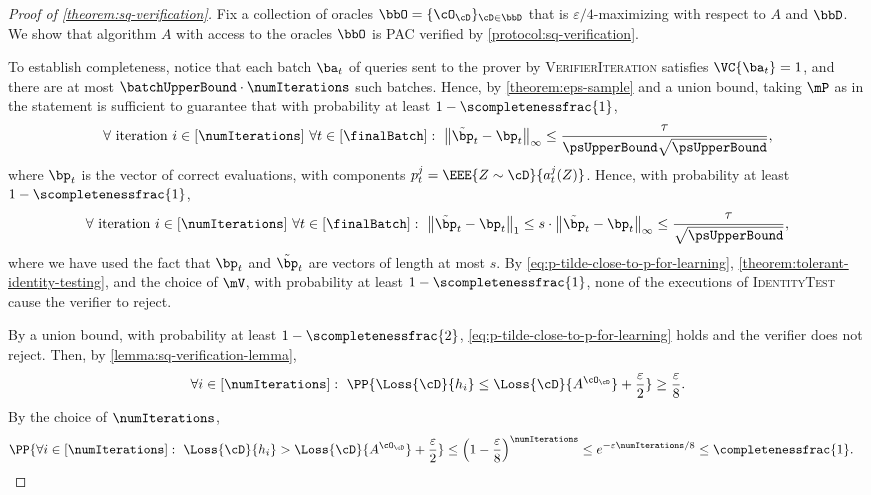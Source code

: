 \documentclass[11pt]{article}
\begin{document}
\begin{proof}[Proof of \cref{theorem:sq-verification}]
	Fix a collection of oracles $\bbO = \{\cO_\cD\}_{\cD \in \bbD}$ that is $\varepsilon/4$-maximizing with respect to $A$ and $\bbD$.
	We show that algorithm $A$ with access to the oracles $\bbO$ is PAC verified by \cref{protocol:sq-verification}.
	
	To establish completeness, notice that each batch $\ba_t$ of queries sent to the prover by \textsc{VerifierIteration} satisfies $\VC{\ba_t} = 1$, and there are at most $\batchUpperBound \cdot \numIterations$ such batches. Hence, by \cref{theorem:eps-sample} and a union bound, taking $\mP$ as in the statement is sufficient to guarantee that with probability at least $1-\scompletenessfrac{1}$, 
	\[
		\forall \text{ iteration } i \in [\numIterations] ~ \forall t \in [\finalBatch]: ~  \left\|\tilde{\bp}_t  - \bp_t\right\|_\infty \leq \frac{\tau}{\psUpperBound\sqrt{\psUpperBound}},
	\]
	where $\bp_t$ is the vector of correct evaluations, with components $p_t^j = \EEE{Z \sim \cD}{a_t^j(Z)}$. Hence, with probability at least $1-\scompletenessfrac{1}$,
	\begin{equation}\label{eq:p-tilde-close-to-p-for-learning}
		\forall \text{ iteration } i \in [\numIterations] ~ \forall t \in [\finalBatch]: ~  \left\|\tilde{\bp}_t  - \bp_t\right\|_1
		\leq 
		s \cdot \left\|\tilde{\bp}_t  - \bp_t\right\|_\infty
		\leq 
		\frac{\tau}{\sqrt{\psUpperBound}},
	\end{equation}
	where we have used the fact that $\bp_t$ and $\tilde{\bp}_t$ are vectors of length at most $s$. 
	By \cref{eq:p-tilde-close-to-p-for-learning}, \cref{theorem:tolerant-identity-testing}, and the choice of $\mV$, with probability at least $1-\scompletenessfrac{1}$, none of the executions of \textsc{IdentityTest} cause the verifier to reject.
	
	By a union bound, with probability at least $1-\scompletenessfrac{2}$, \cref{eq:p-tilde-close-to-p-for-learning} holds and the verifier does not reject. Then, by \cref{lemma:sq-verification-lemma}, 
	\begin{equation}\label{eq:h-is-good-with-pr-eps}
		\forall i \in [\numIterations]: ~ \PP{\Loss{\cD}{h_i} \leq \Loss{\cD}{A^{\cO_\cD}} + \frac{\varepsilon}{2}} \geq \frac{\varepsilon}{8}.
	\end{equation}
	By the choice of $\numIterations$,
	\begin{align}\label{eq:exists-good-h}
		\PP{\forall i \in [\numIterations]: ~ \Loss{\cD}{h_i} > \Loss{\cD}{A^{\cO_\cD}} + \frac{\varepsilon}{2}} &\leq \left(1-\frac{\varepsilon}{8}\right)^\numIterations \leq e^{-\varepsilon\numIterations/8} \leq \completenessfrac{1}.
	\end{align}
	

\end{proof}
\end{document}

